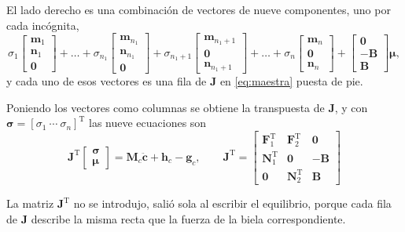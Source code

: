 \documentclass[11pt]{article}
\newcommand{\T}{^{\mathrm{T}}}
\newcommand{\Fmat}{\mathbf{F}}
\newcommand{\Nmat}{\mathbf{N}}
\newcommand{\muv}{\boldsymbol{\mu}}
\newcommand{\sig}{\boldsymbol{\sigma}}
\newcommand{\cdd}{\ddot{\mathbf{c}}}
\begin{document}
El lado derecho es una combinación de vectores de nueve componentes, uno por cada incógnita,
\begin{equation}
\sigma_1\begin{bmatrix}\mathbf{m}_1\\ \mathbf{n}_1\\ \mathbf{0}\end{bmatrix}
+\dots+
\sigma_{n_1}\begin{bmatrix}\mathbf{m}_{n_1}\\ \mathbf{n}_{n_1}\\ \mathbf{0}\end{bmatrix}
+\sigma_{n_1+1}\begin{bmatrix}\mathbf{m}_{n_1+1}\\ \mathbf{0}\\ \mathbf{n}_{n_1+1}\end{bmatrix}
+\dots+
\sigma_{n}\begin{bmatrix}\mathbf{m}_{n}\\ \mathbf{0}\\ \mathbf{n}_{n}\end{bmatrix}
+\begin{bmatrix}\mathbf{0}\\ -\mathbf{B}\\ \mathbf{B}\end{bmatrix}\muv ,
\label{eq:JTcol}
\end{equation}
y cada uno de esos vectores es una fila de $\mathbf{J}$ en \eqref{eq:maestra} puesta de pie.

Poniendo los vectores como columnas se obtiene la transpuesta de $\mathbf{J}$, y con $\sig=[\sigma_1\ \cdots\ \sigma_n]\T$ las nueve ecuaciones son
\begin{equation}
\boxed{\ \mathbf{J}\T\begin{bmatrix}\sig\\ \muv\end{bmatrix}=\mathbf{M}_c\cdd+\mathbf{h}_c-\mathbf{g}_c,
\qquad
\mathbf{J}\T=
\begin{bmatrix}
\Fmat_1\T & \Fmat_2\T & \mathbf{0}\\
\Nmat_1\T & \mathbf{0} & -\mathbf{B}\\
\mathbf{0} & \Nmat_2\T & \mathbf{B}
\end{bmatrix}\ }
\label{eq:NEmat}
\end{equation}

La matriz $\mathbf{J}\T$ no se introdujo, salió sola al escribir el equilibrio, porque cada fila de $\mathbf{J}$ describe la misma recta que la fuerza de la biela correspondiente.
\end{document}
